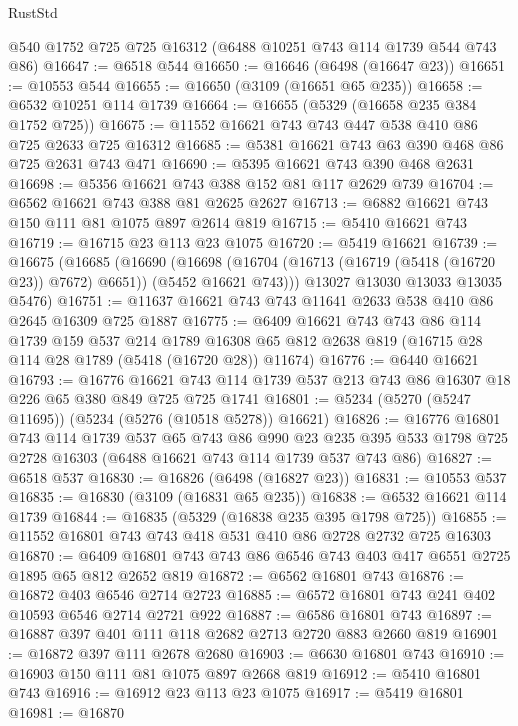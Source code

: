 \begin{lexlean}{RustStd}
\begin{coremodule}
    @540
    @1752
    @725
    @725
    @16312
    (@6488 @10251 @743 @114 @1739 @544 @743 @86)
@16647 := @6518 @544
@16650 := @16646 (@6498 (@16647 @23))
@16651 := @10553 @544
@16655 := @16650 (@3109 (@16651 @65 @235))
@16658 := @6532 @10251 @114 @1739
@16664 := @16655 (@5329 (@16658 @235 @384 @1752 @725))
@16675 := @11552 @16621 @743 @743 @447 @538 @410 @86 @725 @2633 @725 @16312
@16685 := @5381 @16621 @743 @63 @390 @468 @86 @725 @2631 @743 @471
@16690 := @5395 @16621 @743 @390 @468 @2631
@16698 := @5356 @16621 @743 @388 @152 @81 @117 @2629 @739
@16704 := @6562 @16621 @743 @388 @81 @2625 @2627
@16713 := @6882 @16621 @743 @150 @111 @81 @1075 @897 @2614 @819
@16715 := @5410 @16621 @743
@16719 := @16715 @23 @113 @23 @1075
@16720 := @5419 @16621
@16739 := @16675
    (@16685
      (@16690
        (@16698 (@16704 (@16713 (@16719 (@5418 (@16720 @23)) @7672) @6651)) (@5452 @16621 @743)))
      @13027
      @13030
      @13033
      @13035
      @5476)
@16751 := @11637 @16621 @743 @743 @11641 @2633 @538 @410 @86 @2645 @16309 @725 @1887
@16775 := @6409
    @16621
    @743
    @743
    @86
    @114
    @1739
    @159
    @537
    @214
    @1789
    @16308
    @65
    @812
    @2638
    @819
    (@16715 @28 @114 @28 @1789 (@5418 (@16720 @28)) @11674)
@16776 := @6440 @16621
@16793 := @16776
    @16621
    @743
    @114
    @1739
    @537
    @213
    @743
    @86
    @16307
    @18
    @226
    @65
    @380
    @849
    @725
    @725
    @1741
@16801 := @5234 (@5270 (@5247 @11695)) (@5234 (@5276 (@10518 @5278)) @16621)
@16826 := @16776
    @16801
    @743
    @114
    @1739
    @537
    @65
    @743
    @86
    @990
    @23
    @235
    @395
    @533
    @1798
    @725
    @2728
    @16303
    (@6488 @16621 @743 @114 @1739 @537 @743 @86)
@16827 := @6518 @537
@16830 := @16826 (@6498 (@16827 @23))
@16831 := @10553 @537
@16835 := @16830 (@3109 (@16831 @65 @235))
@16838 := @6532 @16621 @114 @1739
@16844 := @16835 (@5329 (@16838 @235 @395 @1798 @725))
@16855 := @11552 @16801 @743 @743 @418 @531 @410 @86 @2728 @2732 @725 @16303
@16870 := @6409 @16801 @743 @743 @86 @6546 @743 @403 @417 @6551 @2725 @1895 @65 @812 @2652 @819
@16872 := @6562 @16801 @743
@16876 := @16872 @403 @6546 @2714 @2723
@16885 := @6572 @16801 @743 @241 @402 @10593 @6546 @2714 @2721 @922
@16887 := @6586 @16801 @743
@16897 := @16887 @397 @401 @111 @118 @2682 @2713 @2720 @883 @2660 @819
@16901 := @16872 @397 @111 @2678 @2680
@16903 := @6630 @16801 @743
@16910 := @16903 @150 @111 @81 @1075 @897 @2668 @819
@16912 := @5410 @16801 @743
@16916 := @16912 @23 @113 @23 @1075
@16917 := @5419 @16801
@16981 := @16870

\end{coremodule}
\end{lexlean}
